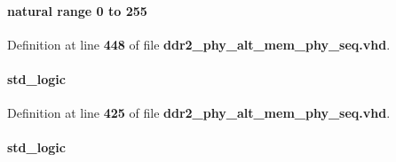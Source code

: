 \paragraph[{tracking\+\_\+period\+\_\+ms}]{ {\bfseries \textcolor{comment}{natural}\textcolor{vhdlchar}{ }\textcolor{vhdlchar}{ }\textcolor{vhdlchar}{ }\textcolor{keywordflow}{range}\textcolor{vhdlchar}{ }\textcolor{vhdlchar}{ } \textcolor{vhdldigit}{0} \textcolor{vhdlchar}{ }\textcolor{keywordflow}{to}\textcolor{vhdlchar}{ }\textcolor{vhdlchar}{ } \textcolor{vhdldigit}{255} \textcolor{vhdlchar}{ }} \hspace{0.3cm}{\ttfamily [Record]}}\label{classddr2__phy__alt__mem__phy__record__pkg_a48ec33a44f709b5cd37cbc4b0762422b}


Definition at line {\bf 448} of file {\bf ddr2\+\_\+phy\+\_\+alt\+\_\+mem\+\_\+phy\+\_\+seq.\+vhd}.

\paragraph[{tracking\+\_\+setup}]{ {\bfseries \textcolor{comment}{std\+\_\+logic}\textcolor{vhdlchar}{ }} \hspace{0.3cm}{\ttfamily [Record]}}\label{classddr2__phy__alt__mem__phy__record__pkg_a52685e64f3ee2418626af5af9b37984e}


Definition at line {\bf 425} of file {\bf ddr2\+\_\+phy\+\_\+alt\+\_\+mem\+\_\+phy\+\_\+seq.\+vhd}.

\paragraph[{was}]{ {\bfseries \textcolor{comment}{std\+\_\+logic}\textcolor{vhdlchar}{ }} \hspace{0.3cm}{\ttfamily [Record]}}\label{classddr2__phy__alt__mem__phy__record__pkg_aa260a35c431f4b4ab1ec108e202d8fd5}


